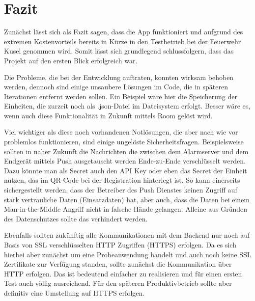 \section{Fazit}
\label{sec:fazit}
Zunächst lässt sich als Fazit sagen, dass die App funktioniert und aufgrund des extremen Kostenvorteils bereits in Kürze in den Testbetrieb bei der Feuerwehr Kusel genommen wird. Somit lässt sich grundlegend schlussfolgern, dass das Projekt auf den ersten Blick erfolgreich war.

Die Probleme, die bei der Entwicklung auftraten, konnten wirksam behoben werden, dennoch sind einige unsaubere Lösungen im Code, die in späteren Iterationen entfernt werden sollen. Ein Beispiel wäre hier die Speicherung der Einheiten, die zurzeit noch als .json-Datei im Dateisystem erfolgt. Besser wäre es, wenn auch diese Funktionalität in Zukunft mittels Room gelöst wird.

Viel wichtiger als diese noch vorhandenen Notlösungen, die aber nach wie vor problemlos funktionieren, sind einige ungelöste Sicherheitsfragen. Beispielsweise sollten in naher Zukunft die Nachrichten die zwischen dem Alarmserver und dem Endgerät mittels Push ausgetauscht werden Ende-zu-Ende verschlüsselt werden. Dazu könnte man als Secret auch den API Key oder eben das Secret der Einheit nutzen, das im QR-Code bei der Registration hinterlegt ist. So kann einerseits sichergestellt werden, dass der Betreiber des Push Dienstes keinen Zugriff auf stark vertrauliche Daten (Einsatzdaten) hat, aber auch, dass die Daten bei einem Man-in-the-Middle Angriff nicht in falsche Hände gelangen. Alleine aus Gründen des Datenschutzes sollte das verhindert werden.

Ebenfalls sollten zukünftig alle Kommunikationen mit dem Backend nur noch auf Basis von SSL verschlüsselten HTTP Zugriffen (HTTPS) erfolgen. Da es sich hierbei aber zunächst um eine Probeanwendung handelt und auch noch keine SSL Zertifikate zur Verfügung standen, sollte zunächst die Kommunikation über HTTP erfolgen. Das ist bedeutend einfacher zu realisieren und für einen ersten Test auch völlig ausreichend. Für den späteren Produktivbetrieb sollte aber definitiv eine Umstellung auf HTTPS erfolgen.